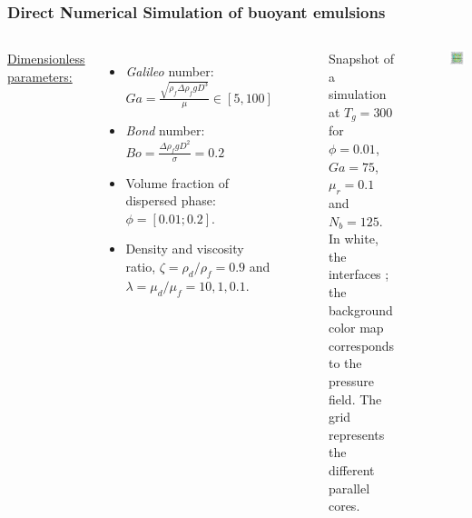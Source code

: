 \documentclass{sintefbeamer}
\begin{document}
  \begin{frame}
    \frametitle{Direct Numerical Simulation of buoyant emulsions}
    \begin{columns}
    \underline{Dimensionless parameters:} 
    \begin{itemize}
      \item \textit{Galileo} number: $Ga =\frac{\sqrt{\rho_f \Delta\rho_f gD^3}}{\mu} \in [5, 100]$
      \item \textit{Bond} number: $Bo = \frac{\Delta \rho_f g D^2}{\sigma} = 0.2$ 
      \item Volume fraction of dispersed phase: $\phi = [0.01;0.2]$. 
      \item Density and viscosity ratio, $\zeta=\rho_d/\rho_f=0.9$ and $\lambda=\mu_d/\mu_f= 10,1,0.1$. 
    \end{itemize}
    
  \begin{figure}
    \caption{Snapshot of a simulation at $T_g = 300$ for $\phi = 0.01$, $Ga = 75$, $\mu_r = 0.1$ and $N_b = 125$. In white, the interfaces ; the background color map corresponds to the pressure field. The grid represents the different parallel cores.
    }
  \end{figure}
  \centering
  \includegraphics[width =  1.1\textwidth]{image/PHI_01_Ga_75.png}
    \end{columns}
\end{frame}
  
\end{document}
